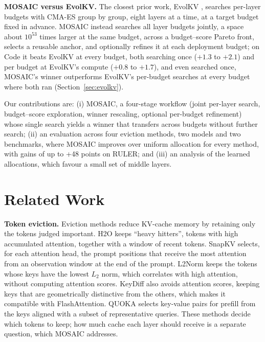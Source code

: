 \documentclass[11pt]{article}
\begin{document}
\textbf{MOSAIC versus EvolKV.}\label{sec:intro-evolkv} The closest prior work, EvolKV \citep{yu2025evolkv}, searches per-layer budgets with CMA-ES group by group, eight layers at a time, at a target budget fixed in advance. MOSAIC instead searches all layer budgets jointly, a space about $10^{53}$ times larger at the same budget, across a budget--score Pareto front, selects a reusable anchor, and optionally refines it at each deployment budget; on Code it beats EvolKV at every budget, both searching once ($+1.3$ to $+2.1$) and per budget at EvolKV's compute ($+0.8$ to $+1.7$), and even searched once, MOSAIC's winner outperforms EvolKV's per-budget searches at every budget where both ran (Section~\ref{sec:evolkv}).

Our contributions are: (i) MOSAIC, a four-stage workflow (joint per-layer search, budget--score exploration, winner rescaling, optional per-budget refinement) whose single search yields a winner that transfers across budgets without further search; (ii) an evaluation across four eviction methods, two models and two benchmarks, where MOSAIC improves over uniform allocation for every method, with gains of up to +48 points on RULER; and (iii) an analysis of the learned allocations, which favour a small set of middle layers.

\section{Related Work}

\textbf{Token eviction.} Eviction methods reduce KV-cache memory by retaining only the tokens judged important. H2O \citep{zhang2023h2o} keeps ``heavy hitters'', tokens with high accumulated attention, together with a window of recent tokens. SnapKV \citep{li2024snapkv} selects, for each attention head, the prompt positions that receive the most attention from an observation window at the end of the prompt. L2Norm \citep{devoto2024l2norm} keeps the tokens whose keys have the lowest $L_2$ norm, which correlates with high attention, without computing attention scores. KeyDiff \citep{park2025keydiff} also avoids attention scores, keeping keys that are geometrically distinctive from the others, which makes it compatible with FlashAttention. QUOKA \citep{jones2026quoka} selects key-value pairs for prefill from the keys aligned with a subset of representative queries. These methods decide which tokens to keep; how much cache each layer should receive is a separate question, which MOSAIC addresses.
\end{document}
